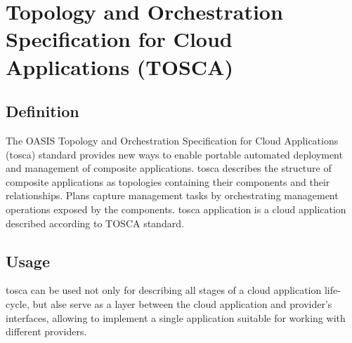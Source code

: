 \section{Topology and Orchestration Specification for Cloud	Applications (TOSCA)} \label{sec:tosca}
\subsection*{Definition}
The OASIS \cite{oasis} Topology and Orchestration Specification for Cloud Applications (\gls{tosca}) standard provides new ways to enable portable automated deployment and management of composite applications.
\gls{tosca} describes the structure of composite applications as topologies containing their components and their relationships.
Plans capture management tasks by orchestrating management operations exposed by the components. \cite*{INBOOK-2014-01}
\gls{tosca} application is a cloud application described according to TOSCA standard.
\subsection*{Usage}
\gls{tosca} can be used not only for describing all stages of a cloud application life-cycle, but alse serve as a layer between the cloud application and provider's interfaces, allowing to implement a single application suitable for working with different providers. 
